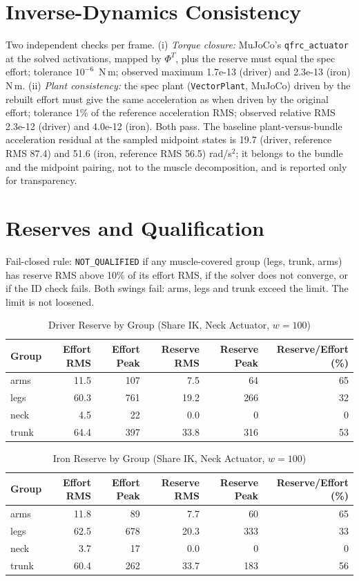 \documentclass[11pt,a4paper]{article}
\begin{document}
\section{Inverse-Dynamics Consistency}
Two independent checks per frame. (i) \emph{Torque closure:} MuJoCo's \texttt{qfrc\_actuator} at the solved activations, mapped by $\Phi^T$, plus the reserve must equal the spec effort; tolerance $10^{-6}$~N\,m; observed maximum 1.7e-13 (driver) and 2.3e-13 (iron) N\,m. (ii) \emph{Plant consistency:} the spec plant (\texttt{VectorPlant}, MuJoCo) driven by the rebuilt effort must give the same acceleration as when driven by the original effort; tolerance 1\% of the reference acceleration RMS; observed relative RMS 2.3e-12 (driver) and 4.0e-12 (iron). Both pass. The baseline plant-versus-bundle acceleration residual at the sampled midpoint states is 19.7 (driver, reference RMS 87.4) and 51.6 (iron, reference RMS 56.5) rad/s$^2$; it belongs to the bundle and the midpoint pairing, not to the muscle decomposition, and is reported only for transparency.

\section{Reserves and Qualification}
Fail-closed rule: \texttt{NOT\_QUALIFIED} if any muscle-covered group (legs, trunk, arms) has reserve RMS above 10\% of its effort RMS, if the solver does not converge, or if the ID check fails. Both swings fail: arms, legs and trunk exceed the limit. The limit is not loosened.

\begin{table}[h]\centering\small
\caption{Driver Reserve by Group (Share IK, Neck Actuator, $w=100$)}
\begin{tabular}{lrrrrr}\toprule Group & Effort RMS & Effort Peak & Reserve RMS & Reserve Peak & Reserve/Effort (\%) \\\midrule
arms & 11.5 & 107 & 7.5 & 64 & 65 \\
legs & 60.3 & 761 & 19.2 & 266 & 32 \\
neck & 4.5 & 22 & 0.0 & 0 & 0 \\
trunk & 64.4 & 397 & 33.8 & 316 & 53 \\
\bottomrule\end{tabular}\end{table}

\begin{table}[h]\centering\small
\caption{Iron Reserve by Group (Share IK, Neck Actuator, $w=100$)}
\begin{tabular}{lrrrrr}\toprule Group & Effort RMS & Effort Peak & Reserve RMS & Reserve Peak & Reserve/Effort (\%) \\\midrule
arms & 11.8 & 89 & 7.7 & 60 & 65 \\
legs & 62.5 & 678 & 20.3 & 333 & 33 \\
neck & 3.7 & 17 & 0.0 & 0 & 0 \\
trunk & 60.4 & 262 & 33.7 & 183 & 56 \\
\bottomrule\end{tabular}\end{table}
\end{document}

